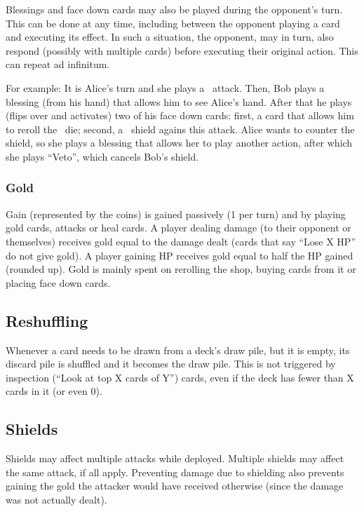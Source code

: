 \documentclass[dvipsnames,parskip,a4paper]{scrartcl}
\newcommand{\iconsize}{3.4mm}
\newcommand{\icondepth}{0.45mm}
\newcommand{\icon}[1]{\raisebox{-\icondepth}{\texttt{[image:  \#1 ]}}}
\newcommand{\fire}{\icon{icons/fire.png}}
\newcommand{\water}{\icon{icons/water.png}}
\begin{document}
Blessings and face down cards may also be played during the opponent's turn. This can be done at any time, including between the opponent playing a card and executing its effect. In such a situation, the opponent, may in turn, also respond (possibly with multiple cards) before executing their original action. This can repeat ad infinitum.

For example: It is Alice's turn and she plays a \fire \ attack. Then, Bob plays a blessing (from his hand) that allows him to see Alice's hand. After that he plays (flips over and activates) two of his face down cards: first, a card that allows him to reroll the \fire \ die; second, a \water \ shield agains this attack. Alice wants to counter the shield, so she plays a blessing that allows her to play another action, after which she plays ``Veto'', which cancels Bob's shield.

\subsubsection*{Gold}

Gain (represented by the coins) is gained passively (1 per turn) and by playing gold cards, attacks or heal cards. A player dealing damage (to their opponent or themselves) receives gold equal to the damage dealt (cards that say ``Lose X HP'' do not give gold). A player gaining HP receives gold equal to half the HP gained (rounded up). Gold is mainly spent on rerolling the shop, buying cards from it or placing face down cards.

\subsection*{Reshuffling}

Whenever a card needs to be drawn from a deck's draw pile, but it is empty, its discard pile is shuffled and it becomes the draw pile. This is not triggered by inspection (``Look at top X cards of Y'') cards, even if the deck has fewer than X cards in it (or even 0).

\subsection*{Shields}

Shields may affect multiple attacks while deployed. Multiple shields may affect the same attack, if all apply. Preventing damage due to shielding also prevents gaining the gold the attacker would have received otherwise (since the damage was not actually dealt).
\end{document}
